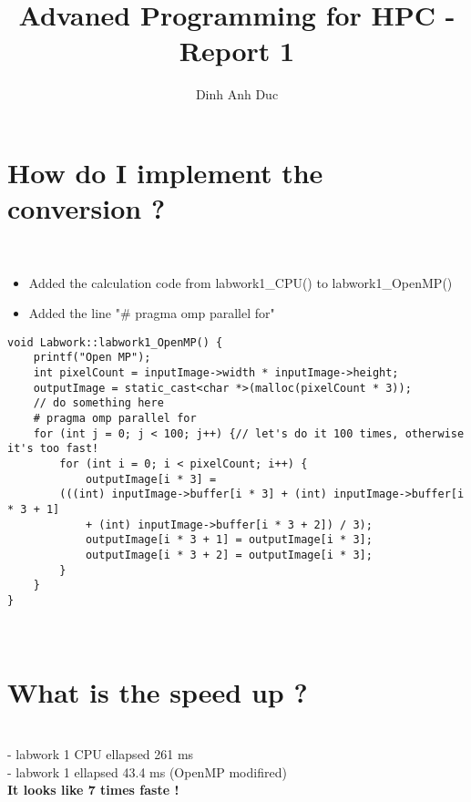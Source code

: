 \documentclass{article}
\title{Advaned Programming for HPC - Report 1}
\author{Dinh Anh Duc}
\begin{document}
\maketitle

\section*{How do I implement the conversion ?}
\\
\begin{itemize}
\item Added the calculation code from labwork1\_CPU() to labwork1\_OpenMP()
\item Added the line "\# pragma omp parallel for" 
\end{itemize}
\begin{lstlisting}
void Labwork::labwork1_OpenMP() {
    printf("Open MP");
    int pixelCount = inputImage->width * inputImage->height;
    outputImage = static_cast<char *>(malloc(pixelCount * 3));
    // do something here
    # pragma omp parallel for
    for (int j = 0; j < 100; j++) {// let's do it 100 times, otherwise it's too fast!
        for (int i = 0; i < pixelCount; i++) {
            outputImage[i * 3] = 
	    (((int) inputImage->buffer[i * 3] + (int) inputImage->buffer[i * 3 + 1] 
            + (int) inputImage->buffer[i * 3 + 2]) / 3); 
            outputImage[i * 3 + 1] = outputImage[i * 3];
            outputImage[i * 3 + 2] = outputImage[i * 3];
        }
    }
}
\end{lstlisting}
\\
\section*{What is the speed up ?}
\\
- labwork 1 CPU ellapsed 261 ms
\\
- labwork 1 ellapsed 43.4 ms (OpenMP modifired)
\\
\textbf{It looks like 7 times faste !} 
\end{document}
